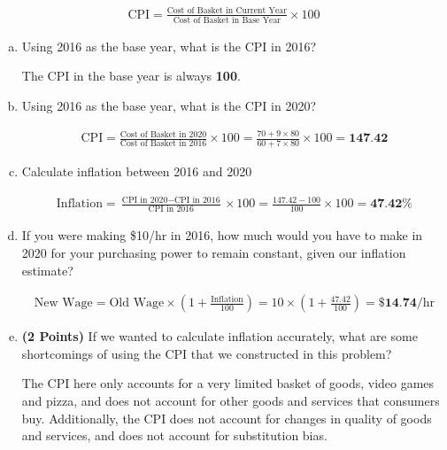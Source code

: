 \documentclass{article}
\begin{document}
\begin{align*}
    \text{CPI} = \frac{\text{Cost of Basket in Current Year}}{\text{Cost of Basket in Base Year}} \times 100
\end{align*}

\begin{enumerate}[(a)]
    \item Using 2016 as the base year, what is the CPI in 2016?

    The CPI in the base year is always \textbf{100}.

    \item Using 2016 as the base year, what is the CPI in 2020?
    
    \begin{align*}
        \text{CPI} = \frac{\text{Cost of Basket in 2020}}{\text{Cost of Basket in 2016}} \times 100 = \frac{70 + 9 \times 80}{60 + 7 \times 80} \times 100 = \textbf{147.42}
    \end{align*}

    \item Calculate inflation between 2016 and 2020
    
    \begin{align*}
        \text{Inflation} = \frac{\text{CPI in 2020} - \text{CPI in 2016}}{\text{CPI in 2016}} \times 100 = \frac{147.42 - 100}{100} \times 100 = \textbf{47.42\%}
    \end{align*}

    \item If you were making \$10/hr in 2016, how much would you have to make in 2020 for your purchasing power to remain constant, given our inflation estimate?
    
    \begin{align*}
        \text{New Wage} = \text{Old Wage} \times \left(1 + \frac{\text{Inflation}}{100}\right) = 10 \times \left(1 + \frac{47.42}{100}\right) = \textbf{\$14.74}\text{/hr}
    \end{align*}

    \item \textbf{(2 Points)} If we wanted to calculate inflation accurately, what are some shortcomings of using the CPI that we constructed in this problem?
    
    The CPI here only accounts for a very limited basket of goods, video games and pizza, and does not account for other goods and services that consumers buy. Additionally, the CPI does not account for changes in quality of goods and services, and does not account for substitution bias.

\end{enumerate}
\end{document}
